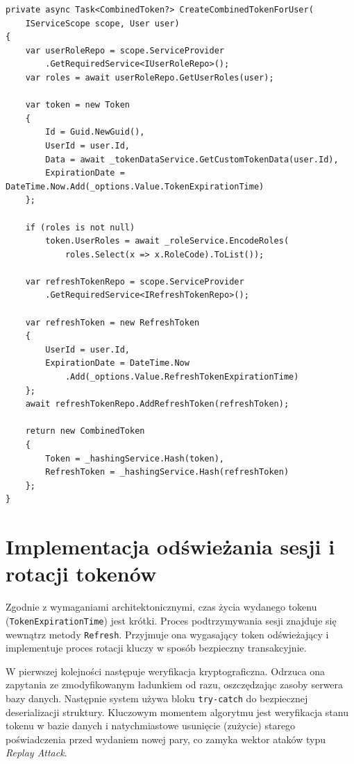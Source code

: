 \documentclass{SGGW-thesis}
\begin{document}
\begin{minipage}{\textwidth}
\begin{lstlisting}    
private async Task<CombinedToken?> CreateCombinedTokenForUser(
    IServiceScope scope, User user)
{
    var userRoleRepo = scope.ServiceProvider
        .GetRequiredService<IUserRoleRepo>();
    var roles = await userRoleRepo.GetUserRoles(user);

    var token = new Token
    {
        Id = Guid.NewGuid(),
        UserId = user.Id,
        Data = await _tokenDataService.GetCustomTokenData(user.Id),
        ExpirationDate = DateTime.Now.Add(_options.Value.TokenExpirationTime)
    };

    if (roles is not null)
        token.UserRoles = await _roleService.EncodeRoles(
            roles.Select(x => x.RoleCode).ToList());

    var refreshTokenRepo = scope.ServiceProvider
        .GetRequiredService<IRefreshTokenRepo>();

    var refreshToken = new RefreshToken
    {
        UserId = user.Id,
        ExpirationDate = DateTime.Now
            .Add(_options.Value.RefreshTokenExpirationTime)
    };
    await refreshTokenRepo.AddRefreshToken(refreshToken);

    return new CombinedToken
    {
        Token = _hashingService.Hash(token),
        RefreshToken = _hashingService.Hash(refreshToken)
    };
}
\end{lstlisting}
\end{minipage}

\section{Implementacja odświeżania sesji i rotacji tokenów}

Zgodnie z wymaganiami architektonicznymi, czas życia wydanego tokenu (\texttt{TokenExpirationTime}) jest krótki. Proces podtrzymywania sesji znajduje się wewnątrz metody \texttt{Refresh}. Przyjmuje ona wygasający token odświeżający i implementuje proces rotacji kluczy w sposób bezpieczny transakcyjnie.

W pierwszej kolejności następuje weryfikacja kryptograficzna. Odrzuca ona zapytania ze zmodyfikowanym ładunkiem od razu, oszczędzając zasoby serwera bazy danych. Następnie system używa bloku \texttt{try-catch} do bezpiecznej deserializacji struktury. Kluczowym momentem algorytmu jest weryfikacja stanu tokenu w bazie danych i natychmiastowe usunięcie (zużycie) starego poświadczenia przed wydaniem nowej pary, co zamyka wektor ataków typu \textit{Replay Attack}.
\end{document}
